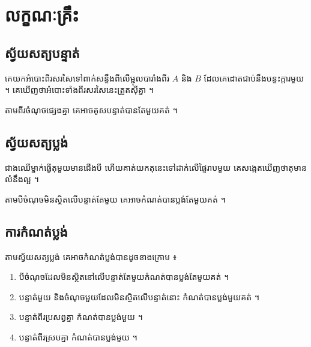 \section{លក្ខណៈគ្រឹះ}
\subsection{ស្វ័យសត្យបន្ទាត់}
គេយកអំបោះពីរសរសៃទៅពាក់សន្ទឹងពីលើម្ជុលបារាំងពីរ $A$ និង $B$ ដែលគេដោតជាប់នឹងបន្ទះក្ដារមួយ ។ គេឃើញថាអំបោះទាំងពីរសរសៃនេះត្រួតស៊ីគ្នា ។
\begin{theorem}[ស្វ័យសត្យ]
តាមពីរចំណុចផ្សេងគ្នា គេអាចគូសបន្ទាត់បានតែមួយគត់ ។
\end{theorem}

\subsection{ស្វ័យសត្យប្លង់}
ជាងឈើម្នាក់ធ្វើតុមួយមានជើងបី ហើយគាត់យកតុនេះទៅដាក់លើផ្ទៃរាបមួយ គេសង្កេតឃើញថាតុមានលំនឹងល្អ ។
\begin{theorem}[ស្វ័យសត្យ]
តាមបីចំណុចមិនស្ថិតលើបន្ទាត់តែមួយ គេអាចកំណត់បានប្លង់តែមួយគត់ ។
\end{theorem}

\subsection{ការកំណត់ប្លង់}
តាមស្វ័យសត្យប្លង់ គេអាចកំណត់ប្លង់បានដូចខាងក្រោម ៖
\begin{center}
\end{center}
\begin{formulaBox}[ការកំណត់ប្លង់]
\begin{enumerate}[1]
  \item បីចំណុចដែលមិនស្ថិតនៅលើបន្ទាត់តែមួយកំណត់បានប្លង់តែមួយគត់ ។
  \item បន្ទាត់មួយ និងចំណុចមួយដែលមិនស្ថិតលើបន្ទាត់នោះ កំណត់បានប្លង់មួយគត់ ។
  \item បន្ទាត់ពីរប្រសព្វគ្នា កំណត់បានប្លង់មួយ ។
  \item បន្ទាត់ពីរស្របគ្នា កំណត់បានប្លង់មួយ ។
\end{enumerate}
\end{formulaBox}

